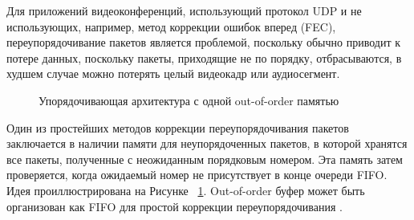 Для приложений видеоконференций, использующий протокол UDP и не использующих, например, метод коррекции ошибок вперед (FEC), переупорядочивание пакетов является проблемой, поскольку обычно приводит к потере данных, поскольку пакеты, приходящие не по порядку, отбрасываются, в худшем случае можно потерять целый видеокадр или аудиосегмент.

\begin{figure}[ht]
\begin{center}

\caption{
\label{out-of-order}
     Упорядочивающая архитектура с одной out-of-order памятью}
\end {center}
\end {figure}

Один из простейших методов коррекции переупорядочивания пакетов заключается в наличии памяти для неупорядоченных пакетов, в которой хранятся все пакеты, полученные с неожиданным порядковым номером. Эта память затем проверяется, когда ожидаемый номер не присутствует в конце очереди FIFO. Идея проиллюстрирована на Рисунке ~\ref{out-of-order}. Out-of-order буфер может быть организован как FIFO для простой коррекции переупорядочивания \cite{v15}.

\pagebreak